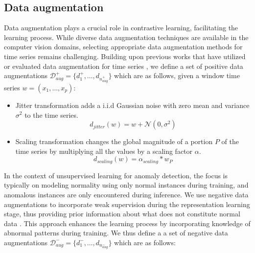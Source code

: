 \subsection{Data augmentation}
Data augmentation plays a crucial role in contrastive learning, facilitating the learning process. While diverse data augmentation techniques are available in the computer vision domains, selecting appropriate data augmentation methods for time series remains challenging. Building upon previous works that have utilized or evaluated data augmentation for time series \cite{chen2020simple, Iwana2020AnES}, we define a set of positive data augmentations $\mathcal{D}_{aug}^{+} = \{d_1^+, \ldots, d_{n_{aug}^+}\}$ which are as follows, given a window time series $w = (x_1, \ldots, x_p)$:
\begin{itemize}
    \item Jitter transformation adds a i.i.d Gaussian noise with zero mean and variance $\sigma^2$ to the time series.
        \begin{equation}
            d_{jitter}(w) = w + \mathcal{N}(0, \sigma^2)
        \end{equation}
    \item Scaling transformation changes the global magnitude of a portion $P$ of the time series by multiplying all the values by a scaling factor $\alpha$.
        \begin{equation}
            d_{scaling}(w) = \alpha_{scaling} * w_P
        \end{equation}
\end{itemize}


In the context of unsupervised learning for anomaly detection, the focus is typically on modeling normality using only normal instances during training, and anomalous instances are only encountered during inference. We use negative data augmentations to incorporate weak supervision during the representation learning stage, thus providing prior information about what does not constitute normal data \cite{DARBAN2025110874, kim2023contrastive, li2023contrastive, sinha2021negative}. This approach enhances the learning process by incorporating knowledge of abnormal patterns during training. We thus define a a set of negative data augmentations $\mathcal{D}_{aug}^{-} = \{d_1^-, \ldots, d_{n_{aug}^-}\}$ which are as follows:

